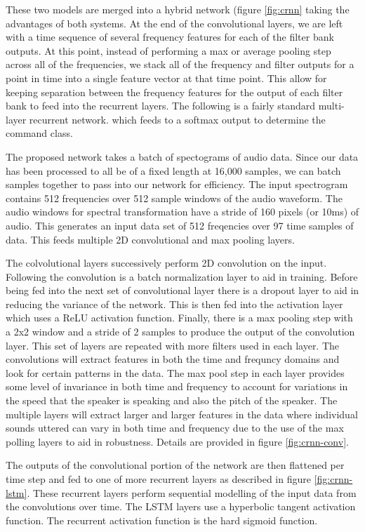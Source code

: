 \documentclass{article}
\begin{document}
These two models are merged into a hybrid network (figure
\ref{fig:crnn} taking the
advantages of both systems. At the end of the convolutional layers, we
are left with a time sequence of several frequency features for each
of the filter bank outputs. At this point, instead of performing a max
or average pooling step across all of the frequencies, we stack all of
the frequency and filter outputs for a point in time into a single
feature vector at that time point. This allow for keeping separation
between the frequency features for the output of each filter bank to
feed into the recurrent layers. The following is a fairly standard
multi-layer recurrent network. which feeds to a softmax output to
determine the command class.

The proposed network takes a batch of spectograms of audio data. Since
our data has been processed to all be of a fixed length at 16,000
samples, we can batch samples together to pass into our network for
efficiency. The input spectrogram contains 512 frequencies over 512
sample windows of the audio waveform. The audio windows for spectral
transformation have a stride of 160 pixels (or 10ms) of audio. This
generates an input data set of 512 freqencies over 97 time samples of
data. This feeds multiple 2D convolutional and max pooling layers.

The colvolutional layers successively perform 2D convolution on the
input. Following the convolution is a batch normalization layer to aid
in training. Before being fed into the next set of convolutional layer
there is a dropout layer to aid in reducing the variance of the
network. This is then fed into the activation layer which uses a
ReLU activation function. Finally, there is a max pooling step with a
2x2 window and a stride of 2 samples to produce the output of the
convolution layer. This set of layers are repeated with more filters
used in each layer. The convolutions will extract features in both the
time and frequncy domains and look for certain patterns in the
data. The max pool step in each layer provides some level of
invariance in both time and frequency to account for variations in the
speed that the speaker is speaking and also the pitch of the
speaker. The multiple layers will extract larger and larger features
in the data where individual sounds uttered can vary in both time and
frequency due to the use of the max polling layers to aid in
robustness. Details are provided in figure \ref{fig:crnn-conv}.

The outputs of the convolutional portion of the network are then
flattened per time step and fed to one of more recurrent layers as
described in figure \ref{fig:crnn-lstm}. These
recurrent layers perform sequential modelling of the input data from
the convolutions over time. The LSTM layers use a hyperbolic tangent
activation function. The recurrent activation function is the hard
sigmoid function.
\end{document}
